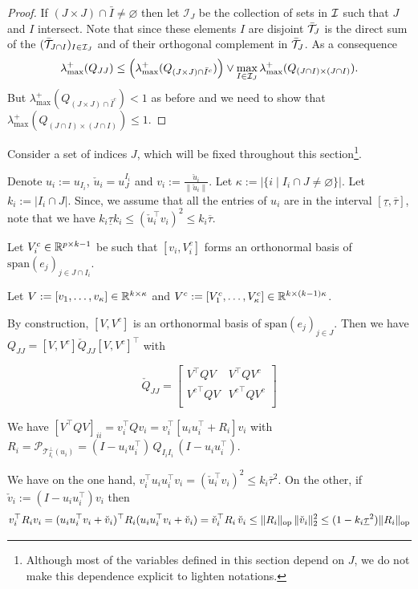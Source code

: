 \documentclass[letterpaper]{article}
\begin{document}
\begin{proof}
If $(J \times J) \cap \bar{I} \neq \varnothing$ then let $\mathcal{I}_{J}$ be the collection of sets in $\mathcal{I}$ such that $J$ and $I$ intersect. Note that since these elements $I$ are disjoint $\bar{\mathcal{T}}_J$ is the direct sum of the $(\bar{\mathcal{T}}_{J\cap I})_{I \in \mathcal{I}_{J}}$ and of their orthogonal complement in $\bar{\mathcal{T}}_J$.
As a consequence
$$\lambda_{\max}^+(Q_{JJ}) \leq \Big ( \lambda_{\max}^+(Q_{(J \times J) \cap \bar{I}^c}) \Big ) \vee \max_{I \in \mathcal{I}_{J}} \lambda_{\max}^+(Q_{(J\cap I) \times (J \cap I)}).$$
But $\lambda_{\max}^+(Q_{(J \times J) \cap \bar{I}^c}) <1$ as before and 
we need to show that $\lambda_{\max}^+(Q_{(J\cap I) \times (J \cap I)}) \leq 1.$
\EET
\end{proof}

Consider a set of indices $J$, which will be fixed throughout this section\footnote{Although most of the variables defined in this section depend on $J$, we do not make this dependence explicit to lighten notations.}.

Denote $u_i:=u_{I_i}$, $\check{u}_i=u^{I_i}_J$ and $v_i:=\frac{\check{u}_i}{\|\check{u}_i\|}$. Let $\kappa:=|\{i \mid I_i \cap J \neq \varnothing\}|.$ Let $k_i:=|I_i \cap J|$. Since, we assume that all the entries of $u_i$ are in the interval $[\underline{\tau}, \overline{\tau}]$, note that we have $k_i \underline{\tau} k_i \leq (\check{u}_i^\top v_i)^2 \leq k_i \overline{\tau}$.

Let $V_i^c \in \mathbb{R}^{p \times k-1}$ be such that $[v_i, V_i^c]$ forms an orthonormal basis of $\text{span}(e_j)_{j \in J \cap I_i}$. 

Let $V:=[v_1,\ldots,v_\kappa] \in \mathbb{R}^{k \times \kappa}$ and $V^c:=[V_1^c,\ldots, V^c_\kappa] \in \mathbb{R}^{k \times   (k-1) \kappa}$. 

By construction, $[V,V^c]$ is an orthonormal basis of $\text{span}(e_j)_{j \in J}$.
Then we have $Q_{JJ}=[V,V^c] \check{Q}_{JJ} [V,V^c]^\top$ with

$$\check{Q}_{JJ}=
\begin{bmatrix}
V^\top Q V & V^\top Q V^c\\
{V^c}^\top Q V & {V^c}^\top Q V^c\\
\end{bmatrix}
$$

We have $[V^\top Q V]_{ii}=v_i^\top Q v_i=v_i^\top [u_i u_i^\top+R_i] v_i$
with $R_i=\mathcal{P}_{\mathcal{T}^{\bot}_{I_i}(u_i)}=(I-u_i u_i^\top)\, Q_{I_iI_i}\,  (I-u_i u_i^\top).$

We have on the one hand, $v_i^\top u_i u_i^\top v_i=(\check{u}_i^\top v_i)^2 \leq k_i \overline{\tau}^2$. On the other, if $\check{v}_i:=(I-u_iu_i^\top) v_i$ then 
$$v_i^\top R_i v_i=(u_i u_i^\top v_i +\check{v}_i)^\top R_i (u_i u_i^\top v_i +\check{v}_i)=\check{v}_i^\top R_i \, \check{v}_i \leq \|R_i\|_{{\rm op}} \, \|\check{v}_i\|^2_2 \leq (1-k_i\underline{\tau}^2) \|R_i\|_{{\rm op}}$$
\end{document}

